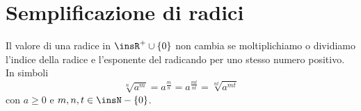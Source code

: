 
\section{Semplificazione di radici}
\label{sec:radici_semplificazione}

\begin{proposizione}
Il valore di una radice in $\insR^+\cup \{0\}$ non cambia se moltiplichiamo 
o dividiamo l'indice della radice e l'esponente del radicando per uno stesso 
numero positivo. 
In simboli 
\[\sqrt[n]{a^m}=a^{\frac{m}{n}}=a^{\frac{mt}{nt}}=\sqrt[nt]{a^{mt}}\]
con $a\ge 0$ e $m,n,t\in \insN-\{0\}$.
\end{proposizione}

% 

